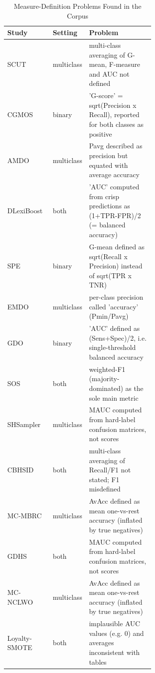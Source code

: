\begin{table}[t]
  \caption{Measure-Definition Problems Found in the Corpus}
  \label{tab:empirical-measuredefs}
  \footnotesize
  \setlength{\tabcolsep}{4pt}
  \begin{tabular}{@{}llp{0.6\linewidth}@{}}
    \toprule
    Study & Setting & Problem\\
    \midrule
    SCUT~\parencite{agrawal2015scut} & multiclass & multi-class averaging of G-mean, F-measure and AUC not defined\\
    CGMOS~\parencite{zhang2016cgmos} & binary & 'G-score' = sqrt(Precision x Recall), reported for both classes as positive\\
    AMDO~\parencite{yang2018amdo} & multiclass & Pavg described as precision but equated with average accuracy\\
    DLexiBoost~\parencite{datta2020dlexiboost} & both & 'AUC' computed from crisp predictions as (1+TPR-FPR)/2 (= balanced accuracy)\\
    SPE~\parencite{liu2020spe} & binary & G-mean defined as sqrt(Recall x Precision) instead of sqrt(TPR x TNR)\\
    EMDO~\parencite{yao2021emdo} & multiclass & per-class precision called 'accuracy' (Pmin/Pavg)\\
    GDO~\parencite{xie2022gdo} & binary & 'AUC' defined as (Sens+Spec)/2, i.e. single-threshold balanced accuracy\\
    SOS~\parencite{kim2022sos} & both & weighted-F1 (majority-dominated) as the sole main metric\\
    SHSampler~\parencite{zheng2022shsampler} & multiclass & MAUC computed from hard-label confusion matrices, not scores\\
    CBHSID~\parencite{palli2022cbhsid} & both & multi-class averaging of Recall/F1 not stated; F1 misdefined\\
    MC-MBRC~\parencite{ma2024mcmbrc} & multiclass & AvAcc defined as mean one-vs-rest accuracy (inflated by true negatives)\\
    GDHS~\parencite{yan2025gdhs} & both & MAUC computed from hard-label confusion matrices, not scores\\
    MC-NCLWO~\parencite{tao2025mcnclwo} & multiclass & AvAcc defined as mean one-vs-rest accuracy (inflated by true negatives)\\
    Loyalty-SMOTE~\parencite{hu2026loyalty} & both & implausible AUC values (e.g. 0) and averages inconsistent with tables\\
    \bottomrule
  \end{tabular}
\end{table}
